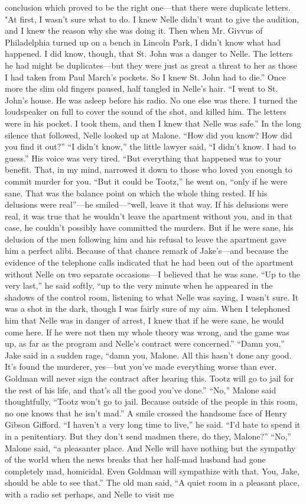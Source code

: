 \documentclass{novel}
\begin{document}
conclusion which proved to be the right one—that there were duplicate letters. "At first, I wasn’t sure what to do. I knew Nelle didn’t want to give the audition, and I knew the reason why she was doing it. Then when Mr. Givvus of Philadelphia turned up on a bench in Lincoln Park, I didn’t know what had happened. I did know, though, that St. John was a danger to Nelle. The letters he had might be duplicates—but they were just as great a threat to her as those I had taken from Paul March’s pockets. So I knew St. John had to die.” Once more the slim old fingers paused, half tangled in Nelle’s hair. “I went to St. John’s house. He was asleep before his radio. No one else was there. I turned the loudspeaker on full to cover the sound of the shot, and killed him. The letters were in his pocket. I took them, and then I knew that Nelle was safe.” In the long silence that followed, Nelle looked up at Malone. “How did you know? How did you find it out?” “I didn’t know,” the little lawyer said, “I didn’t know. I had to guess.” His voice was very tired. “But everything that happened was to your benefit. That, in my mind, narrowed it down to those who loved you enough to commit murder for you. “But it could be Tootz,” he went on, “only if he were sane. That was the balance point on which the whole thing rested. If his delusions were real”—he smiled—“well, leave it that way. If his delusions were real, it was true that he wouldn’t leave the apartment without you, and in that case, he couldn’t possibly have committed the murders. But if he were sane, his delusion of the men following him and his refusal to leave the apartment gave him a perfect alibi. Because of that chance remark of Jake’s—and because the evidence of the telephone calls indicated that he had been out of the apartment without Nelle on two separate occasions—I believed that he was sane. “Up to the very last,” he said softly, “up to the very minute when he appeared in the shadows of the control room, listening to what Nelle was saying, I wasn’t sure. It was a shot in the dark, though I was fairly sure of my aim. When I telephoned him that Nelle was in danger of arrest, I knew that if he were sane, he would come here. If he were not then my whole theory was wrong, and the game was up, as far as the program and Nelle’s contract were concerned.” “Damn you,” Jake said in a sudden rage, “damn you, Malone. All this hasn’t done any good. It’s found the murderer, yes—but you’ve made everything worse than ever. Goldman will never sign the contract after hearing this. Tootz will go to jail for the rest of his life, and that’s all the good you’ve done.” “No,” Malone said thoughtfully, “Tootz won’t go to jail. Because outside of the people in this room, no one knows that he isn’t mad.” A smile crossed the handsome face of Henry Gibson Gifford. “I haven’t a very long time to live,” he said. “I’d hate to spend it in a penitentiary. But they don’t send madmen there, do they, Malone?” “No,” Malone said, “a pleasanter place. And Nelle will have nothing but the sympathy of the world when the news breaks that her half-mad husband had gone completely mad, homicidal. Even Goldman will sympathize with that. You, Jake, should be able to see that.” The old man said, “A quiet room in a pleasant place, with a radio set perhaps, and Nelle to visit me 
\end{document}
